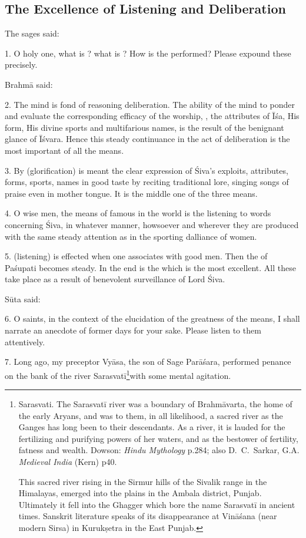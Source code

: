 \subsection{The Excellence of Listening and Deliberation}

The sages said:

1. O holy one, what is ? what is ? How is the 
performed? Please expound these precisely.

Brahmā said:

2. The mind is fond of reasoning deliberation. The ability of the mind to ponder
and evaluate the corresponding efficacy of the worship, ,
the attributes of Īśa, His form, His divine sports and multifarious names, is
the result of the benignant glance of Īśvara. Hence this steady continuance in
the act of deliberation is the most important of all the means.

3. By  (glorification) is meant the clear expression of Śiva’s
exploits, attributes, forms, sports, names \etc in good taste by reciting
traditional lore, singing songs of praise even in mother tongue. It is the
middle one of the three means.

4. O wise men, the means of  famous in the world is the listening
to words concerning Śiva, in whatever manner, howsoever and wherever they are
produced with the same steady attention as in the sporting dalliance of women.

5.  (listening) is effected when one associates with good men. Then
the  of Paśupati becomes steady. In the end is the  which
is the most excellent. All these take place as a result of benevolent
surveillance of Lord Śiva.

Sūta said:

6. O saints, in the context of the elucidation of the greatness of the means,
I shall narrate an anecdote of former days for your sake. Please listen to them
attentively.

7. Long ago, my preceptor Vyāsa, the son of Sage Parāśara, performed penance on
the bank of the river Sarasvatī\footnote{Sarasvati. The Sarasvatī river was a
boundary of Brahmāvarta, the home of the early Aryans, and was to them, in all
likelihood, a sacred river as the Ganges has long been to their descendants. As
a river, it is lauded for the fertilizing and purifying powers of her waters,
and as the bestower of fertility, fatness and wealth. Dowson: \emph{Hindu
Mythology} p.284; also D.~C.~Sarkar, G.A. \emph{Medieval India} (Kern) p40.

This sacred river rising in the Sirmur hills of the Sivalik range in
the Himalayas, emerged into the plains in the Ambala district, Punjab.
Ultimately it fell into the Ghagger which bore the name Sarasvatī in ancient
times. Sanskrit literature speaks of its disappearance at Vināśana (near modern
Sirsa) in Kurukṣetra in the East Punjab.}with some mental agitation.

